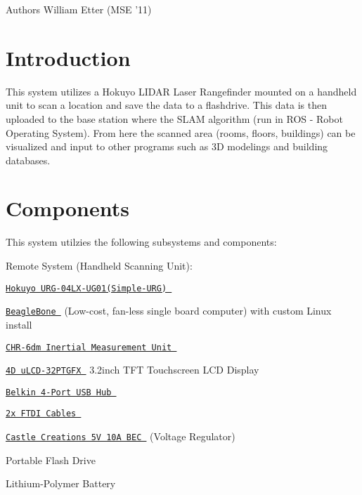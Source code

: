 \begin{DoxyAuthor}{Authors}
William Etter (MSE '11)
\end{DoxyAuthor}


\hypertarget{index_intro}{}\section{Introduction}\label{index_intro}
This system utilizes a Hokuyo LIDAR Laser Rangefinder mounted on a handheld unit to scan a location and save the data to a flashdrive. This data is then uploaded to the base station where the SLAM algorithm (run in ROS -\/ Robot Operating System). From here the scanned area (rooms, floors, buildings) can be visualized and input to other programs such as 3D modelings and building databases.\hypertarget{index_components}{}\section{Components}\label{index_components}
This system utilzies the following subsystems and components:


\begin{DoxyItemize}
\item Remote System (Handheld Scanning Unit):
\end{DoxyItemize}
\begin{DoxyEnumerate}
\item \href{http://www.hokuyo-aut.jp/02sensor/07scanner/urg_04lx.html}{\tt Hokuyo URG-\/04LX-\/UG01(Simple-\/URG) }
\item \href{http://beagleboard.org/bone}{\tt BeagleBone } (Low-\/cost, fan-\/less single board computer) with custom Linux install
\item \href{http://www.chrobotics.com/index.php?main_page=product_info&products_id=2CHRobotics}{\tt CHR-\/6dm Inertial Measurement Unit }
\item \href{http://www.4dsystems.com.au/prod.php?id=114}{\tt 4D uLCD-\/32PTGFX } 3.2inch TFT Touchscreen LCD Display
\item \href{http://www.newegg.com/Product/Product.aspx?Item=N82E16817394106}{\tt Belkin 4-\/Port USB Hub }
\item \href{www.sparkfun.com/products/9718}{\tt 2x FTDI Cables }
\item \href{http://www.castlecreations.com/products/ccbec.html}{\tt Castle Creations 5V 10A BEC } (Voltage Regulator)
\item Portable Flash Drive
\item Lithium-\/Polymer Battery
\end{DoxyEnumerate}


